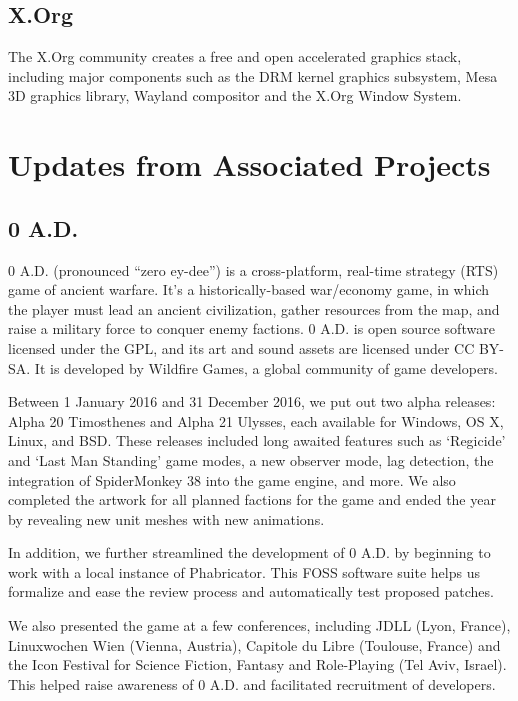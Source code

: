 \documentclass[letterpaper]{report}
\begin{document}
\subsection{X.Org}

The X.Org community creates a free and open accelerated graphics stack,
including major components such as the DRM kernel graphics subsystem,
Mesa 3D graphics library, Wayland compositor and the X.Org Window
System.


\section{Updates from Associated Projects}

\subsection{0 A.D.}

0 A.D. (pronounced ``zero ey-dee'') is a cross-platform, real-time
strategy (RTS) game of ancient warfare. It's a historically-based
war/economy game, in which the player must lead an ancient civilization,
gather resources from the map, and raise a military force to conquer
enemy factions. 0 A.D. is open source software licensed under the GPL,
and its art and sound assets are licensed under CC BY-SA. It is
developed by Wildfire Games, a global community of game developers.

Between 1 January 2016 and 31 December 2016, we put out two alpha
releases: Alpha 20 Timosthenes and Alpha 21 Ulysses, each available for
Windows, OS X, Linux, and BSD. These releases included long awaited
features such as `Regicide' and `Last Man Standing' game modes, a new
observer mode, lag detection, the integration of SpiderMonkey 38 into
the game engine, and more. We also completed the artwork for all planned
factions for the game and ended the year by revealing new unit meshes
with new animations.

In addition, we further streamlined the development of 0 A.D. by
beginning to work with a local instance of Phabricator. This FOSS
software suite helps us formalize and ease the review process and
automatically test proposed patches.

We also presented the game at a few conferences, including JDLL (Lyon,
France), Linuxwochen Wien (Vienna, Austria), Capitole du Libre
(Toulouse, France) and the Icon Festival for Science Fiction, Fantasy
and Role-Playing (Tel Aviv, Israel). This helped raise awareness of 0
A.D. and facilitated recruitment of developers.
\end{document}
